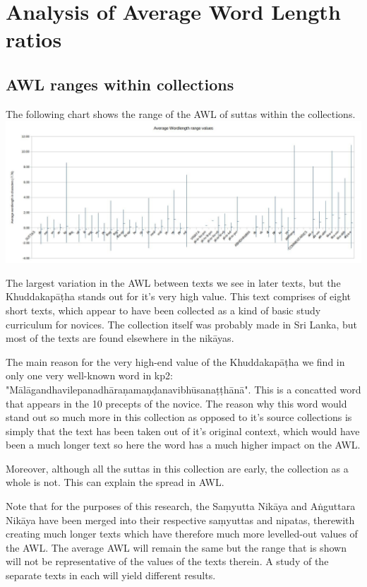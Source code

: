 \section{Analysis of Average Word Length ratios}
\subsection{AWL ranges within collections}
The following chart shows the range of the AWL of suttas within the collections.\\

\includegraphics[width=\linewidth]{minmax.jpg}
\label{minmax}

\medskip
The largest variation in the AWL between texts we see in later texts, but the Khuddakapāṭha stands out for it's very high value. This text comprises of eight short texts, which appear to have been collected as a kind of basic study curriculum for novices. The collection itself was probably made in Sri Lanka, but most of the texts are found elsewhere in the nikāyas.

The main reason for the very high-end value of the Khuddakapāṭha we find in only one very well-known word in kp2: "Mālāgandhavilepanadhāraṇamaṇḍanavibhūsanaṭṭhānā". This is a concatted word that appears in the 10 precepts of the novice. The reason why this word would stand out so much more in this collection as opposed to it's source collections is simply that the text has been taken out of it's original context, which would have been a much longer text so here the word has a much higher impact on the AWL. 

Moreover, although all the suttas in this collection are early, the collection as a whole is not. This can explain the spread in AWL.

Note that for the purposes of this research, the Saṃyutta Nikāya and Aṅguttara Nikāya have been merged into their respective saṃyuttas and nipatas, therewith creating much longer texts which have therefore much more levelled-out values of the AWL. The average AWL will remain the same but the range that is shown will not be representative of the values of the texts therein. A study of the separate texts in each will yield different results.

